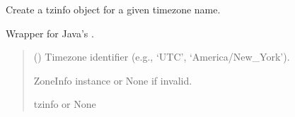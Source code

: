 \documentclass[letterpaper,10pt,english]{sphinxmanual}
\begin{document}
\begin{fulllineitems}
\label{\detokenize{apache_commons_validator_python.util:apache_commons_validator_python.util.datetime_helpers.timezone_gmt}}
\pysigstartsignatures
{}
\pysigstopsignatures
\sphinxAtStartPar
Create a tzinfo object for a given timezone name.

\sphinxAtStartPar
Wrapper for Java’s .
\begin{quote}\begin{description}
\sphinxAtStartPar
{} () \textendash{} Timezone identifier (e.g., ‘UTC’, ‘America/New\_York’).

\sphinxAtStartPar
ZoneInfo instance or None if invalid.

\sphinxAtStartPar
tzinfo or None

\end{description}\end{quote}

\end{fulllineitems}

\end{document}
